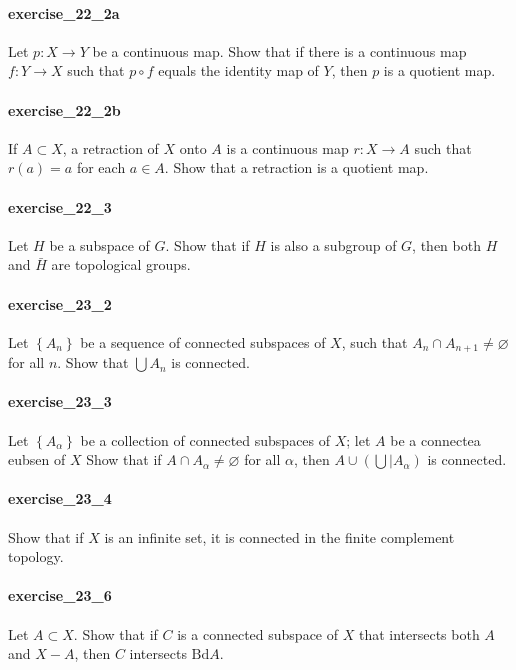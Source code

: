 \documentclass{article}
\begin{document}
\paragraph{exercise\_22\_2a} Let $p: X \rightarrow Y$ be a continuous map. Show that if there is a continuous map $f: Y \rightarrow X$ such that $p \circ f$ equals the identity map of $Y$, then $p$ is a quotient map.

\paragraph{exercise\_22\_2b} If $A \subset X$, a retraction of $X$ onto $A$ is a continuous map $r: X \rightarrow A$ such that $r(a)=a$ for each $a \in A$. Show that a retraction is a quotient map.

\paragraph{exercise\_22\_3} Let $H$ be a subspace of $G$. Show that if $H$ is also a subgroup of $G$, then both $H$ and $\bar{H}$ are topological groups.

\paragraph{exercise\_23\_2} Let $\left\{A_{n}\right\}$ be a sequence of connected subspaces of $X$, such that $A_{n} \cap A_{n+1} \neq \varnothing$ for all $n$. Show that $\bigcup A_{n}$ is connected.

\paragraph{exercise\_23\_3} Let $\left\{A_{\alpha}\right\}$ be a collection of connected subspaces of $X$; let $A$ be a connectea eubsen of $X$ Show that if $A \cap A_{\alpha} \neq \varnothing$ for all $\alpha$, then $A \cup\left(\bigcup \mid A_{\alpha}\right)$ is connected.

\paragraph{exercise\_23\_4} Show that if $X$ is an infinite set, it is connected in the finite complement topology.

\paragraph{exercise\_23\_6} Let $A \subset X$. Show that if $C$ is a connected subspace of $X$ that intersects both $A$ and $X-A$, then $C$ intersects $\mathrm{Bd} A$.
\end{document}
